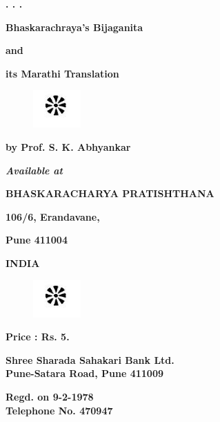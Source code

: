 \documentclass[]{article}
\begin{document}
\begin{center}
    \textbf{\Huge . . .}
\end{center}
\newpage
\thispagestyle{empty}
\begin{center}
    

\textbf{\Large Bhaskarachraya's Bijaganita}
\vspace{4mm}

\textbf{\Large and }
\vspace{4mm}

\textbf{\Large its Marathi Translation}

\vspace{10pt}
\begin{figure}[h!]
    \centering
    \includegraphics{Capture1}
\end{figure}
\vspace{10pt}

\textbf{\Large by Prof. S. K. Abhyankar}

\vspace{60pt}
\textbf{\textit{\large Available at}}
\vspace{30pt}

\textbf{\Large BHASKARACHARYA PRATISHTHANA}
\vspace{2mm}

\textbf{\large 106/6, Erandavane,}
\vspace{2mm}

\textbf{\large Pune 411004}
\vspace{2mm}

\textbf{\large INDIA}

\vspace{30pt}
\begin{figure}[h!]
    \centering
    \includegraphics{Capture1}
\end{figure}
\vspace{20pt}

\textbf{\large Price : Rs. 5.}
\end{center}
\newpage
\thispagestyle{empty}
\large
\begin{center}
\textbf{\Large Shree Sharada Sahakari Bank Ltd.}\\
\vspace{10pt}
\textbf{\Large Pune-Satara Road, Pune 411009}\\
\vspace{10pt}
\begin{multicols}{2}
\textbf{\large Regd. on 9-2-1978}\\ \textbf{\large Telephone No. 470947}
\end{multicols}
\end{center}
\end{document}
